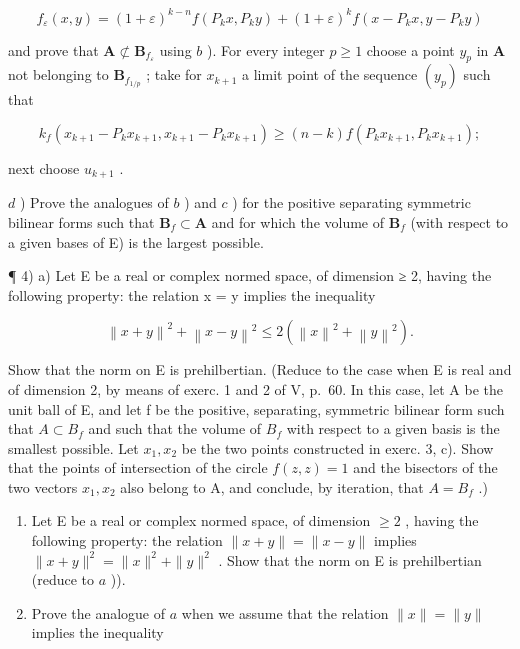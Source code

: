 \[
f _ {\varepsilon} (x, y) = (1 + \varepsilon) ^ {k - n} f \left(P _ {k} x, P _ {k} y\right) + (1 + \varepsilon) ^ {k} f \left(x - P _ {k} x, y - P _ {k} y\right)
\]

and prove that \(\mathbf{A} \not\subset \mathbf{B}_{f_{\varepsilon}}\) using \(b\) ). For every integer \(p \geqslant 1\) choose a point \(y_{p}\) in \(\mathbf{A}\) not belonging to \(\mathbf{B}_{f_{1/p}}\) ; take for \(x_{k+1}\) a limit point of the sequence \((y_{p})\) such that

\[
k _ {f} \left(x _ {k + 1} - P _ {k} x _ {k + 1}, x _ {k + 1} - P _ {k} x _ {k + 1}\right) \geqslant (n - k) f \left(P _ {k} x _ {k + 1}, P _ {k} x _ {k + 1}\right);
\]

next choose \(u_{k+1}\) .

\(d\) ) Prove the analogues of \(b\) ) and \(c\) ) for the positive separating symmetric bilinear forms such that \(\mathbf{B}_f\subset \mathbf{A}\) and for which the volume of \(\mathbf{B}_f\) (with respect to a given bases of E) is the largest possible.

¶ 4) a) Let E be a real or complex normed space, of dimension ≥ 2, having the following property: the relation \textbar\textbar x\textbar\textbar{} = \textbar\textbar y\textbar\textbar{} implies the inequality

\[
\left\| x + y \right\| ^ {2} + \left\| x - y \right\| ^ {2} \leqslant 2 \left(\left\| x \right\| ^ {2} + \left\| y \right\| ^ {2}\right).
\]

Show that the norm on E is prehilbertian. (Reduce to the case when E is real and of dimension 2, by means of exerc. 1 and 2 of V, p.~60. In this case, let A be the unit ball of E, and let f be the positive, separating, symmetric bilinear form such that \(A \subset B_{f}\) and such that the volume of \(B_{f}\) with respect to a given basis is the smallest possible. Let \(x_{1}, x_{2}\) be the two points constructed in exerc. 3, c). Show that the points of intersection of the circle \(f(z, z) = 1\) and the bisectors of the two vectors \(x_{1}, x_{2}\) also belong to A, and conclude, by iteration, that \(A = B_{f}\) .)

\begin{enumerate}
\def\labelenumi{\alph{enumi})}
\setcounter{enumi}{1}
\item
  Let E be a real or complex normed space, of dimension \(\geqslant 2\) , having the following property: the relation \(\| x + y \| = \| x - y \|\) implies \(\| x + y \|^2 = \| x \|^2 + \| y \|^2\) . Show that the norm on E is prehilbertian (reduce to \(a\) )).
\item
  Prove the analogue of \(a\) when we assume that the relation \(\| x\| = \| y\|\) implies the inequality
\end{enumerate}

